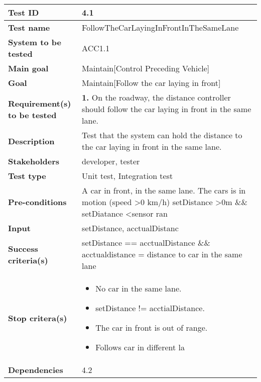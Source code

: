 	\begin{table}[H]
		\begin{tabular}{| p{4cm} | p{10cm} |}
			\hline
			\rowcolor{gray}
			{\bf Test ID} & 4.1 \\ \hline
			{\bf Test name} & FollowTheCarLayingInFrontInTheSameLane \\ \hline
			{\bf System to be tested} & ACC1.1\\ \hline
			{\bf Main goal} & Maintain[Control Preceding Vehicle] \\ \hline
			{\bf Goal} & Maintain[Follow the car laying in front] \\ \hline
			{\bf Requirement(s) to be tested} & {\bf 1.} On the roadway, the distance 
			controller should follow the car laying in front in the same lane. \\ \hline
			{\bf Description} & Test that the system can hold the distance to the car laying in 
			front in the same lane. \\ \hline
			{\bf Stakeholders} & developer, tester\\ \hline
			{\bf Test type} &  Unit test, Integration test \\ \hline
			{\bf Pre-conditions} & A car in front, in the same lane.
			The cars is in motion (speed \textgreater 0 km/h)
			setDistance \textgreater 0m \&\& setDiatance \textless sensor ran\\ \hline
			{\bf Input} & setDistance, acctualDistanc \\ \hline
			{\bf Success criteria(s)} & setDistance == acctualDistance \&\& acctualdistance 
			= distance to car in the same lane \\ \hline
			{\bf Stop critera(s)} &  
				\begin{itemize}
					\item No car in the same lane.
					\item setDistance != acctialDistance.
					\item The car in front is out of range.
					\item Follows car in different la
				\end{itemize}\\ \hline
			{\bf Dependencies} & 4.2\\ \hline
		\end{tabular}
	\end{table}


